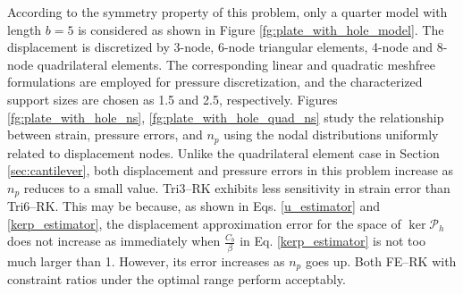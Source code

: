 According to the symmetry property of this problem, only a quarter model with length $b=5$ is considered as shown in Figure \ref{fg:plate_with_hole_model}. The displacement is discretized by 3-node, 6-node triangular elements, 4-node and 8-node quadrilateral elements. The corresponding linear and quadratic meshfree formulations are employed for pressure discretization, and the characterized support sizes are chosen as 1.5 and 2.5, respectively.
Figures \ref{fg:plate_with_hole_ns}, \ref{fg:plate_with_hole_quad_ns} study the relationship between strain, pressure errors, and $n_p$ using the nodal distributions uniformly related to displacement nodes.
Unlike the quadrilateral element case in Section \ref{sec:cantilever}, both displacement and pressure errors in this problem increase as $n_p$ reduces to a small value.
Tri3--RK exhibits less sensitivity in strain error than Tri6--RK.
This may be because, as shown in Eqs. \eqref{u_estimator} and \eqref{kerp_estimator}, the displacement approximation error for the space of $\ker \mathcal P_h$ does not increase as immediately when $\frac{C_b}{\beta}$ in Eq. \eqref{kerp_estimator} is not too much larger than 1.
However, its error increases as $n_p$ goes up.
Both FE--RK with constraint ratios under the optimal range perform acceptably. 

